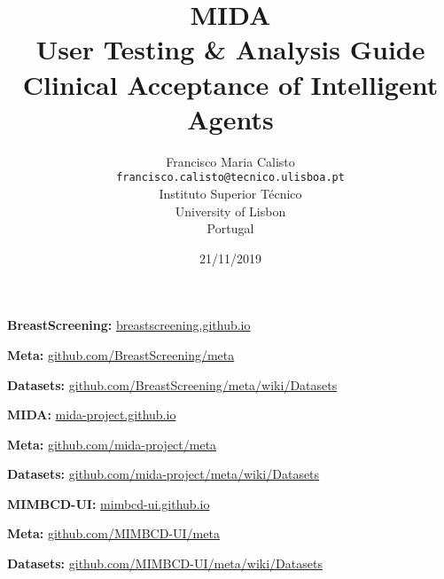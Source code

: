 \documentclass{article}
\title{
MIDA
\\
User Testing \& Analysis Guide
\\
Clinical Acceptance of Intelligent Agents
\\
}
\author{
Francisco Maria Calisto\\
\texttt{francisco.calisto@tecnico.ulisboa.pt}\\
Instituto Superior T\'{e}cnico\\
University of Lisbon\\
Portugal
}
\date{21/11/2019}
\begin{document}
\maketitle

\textbf{BreastScreening:} \hfill \href{https://breastscreening.github.io/}{breastscreening.github.io}

\textbf{Meta:} \hfill \href{https://github.com/BreastScreening/meta}{github.com/BreastScreening/meta}

\textbf{Datasets:} \hfill \href{https://github.com/BreastScreening/meta/wiki/Datasets}{github.com/BreastScreening/meta/wiki/Datasets}

\hfill

\textbf{MIDA:} \hfill \href{https://mida-project.github.io/}{mida-project.github.io}

\textbf{Meta:} \hfill \href{https://github.com/mida-project/meta}{github.com/mida-project/meta}

\textbf{Datasets:} \hfill \href{https://github.com/mida-project/meta/wiki/Datasets}{github.com/mida-project/meta/wiki/Datasets}

\hfill

\textbf{MIMBCD-UI:} \hfill \href{https://mimbcd-ui.github.io/}{mimbcd-ui.github.io}

\textbf{Meta:} \hfill \href{https://github.com/MIMBCD-UI/meta}{github.com/MIMBCD-UI/meta}

\textbf{Datasets:} \hfill \href{https://github.com/MIMBCD-UI/meta/wiki/Datasets}{github.com/MIMBCD-UI/meta/wiki/Datasets}

\clearpage














\clearpage

\glsaddall
\printglossary[type=\acronymtype,title=Acronyms]

\clearpage



\end{document}
